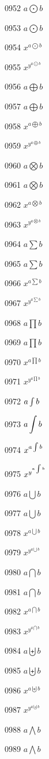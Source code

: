 \documentclass{article}
\begin{document}
0952 $a\bigodot b$\par
0953 $\displaystyle a\bigodot b$\par
0954 $x^{a\bigodot b}$\par
0955 $x^{y^{a\bigodot b}}$\par
0956 $a\bigoplus b$\par
0957 $\displaystyle a\bigoplus b$\par
0958 $x^{a\bigoplus b}$\par
0959 $x^{y^{a\bigoplus b}}$\par
0960 $a\bigotimes b$\par
0961 $\displaystyle a\bigotimes b$\par
0962 $x^{a\bigotimes b}$\par
0963 $x^{y^{a\bigotimes b}}$\par
0964 $a\sum b$\par
0965 $\displaystyle a\sum b$\par
0966 $x^{a\sum b}$\par
0967 $x^{y^{a\sum b}}$\par
0968 $a\prod b$\par
0969 $\displaystyle a\prod b$\par
0970 $x^{a\prod b}$\par
0971 $x^{y^{a\prod b}}$\par
0972 $a\intop b$\par
0973 $\displaystyle a\intop b$\par
0974 $x^{a\intop b}$\par
0975 $x^{y^{a\intop b}}$\par
0976 $a\bigcup b$\par
0977 $\displaystyle a\bigcup b$\par
0978 $x^{a\bigcup b}$\par
0979 $x^{y^{a\bigcup b}}$\par
0980 $a\bigcap b$\par
0981 $\displaystyle a\bigcap b$\par
0982 $x^{a\bigcap b}$\par
0983 $x^{y^{a\bigcap b}}$\par
0984 $a\biguplus b$\par
0985 $\displaystyle a\biguplus b$\par
0986 $x^{a\biguplus b}$\par
0987 $x^{y^{a\biguplus b}}$\par
0988 $a\bigwedge b$\par
0989 $\displaystyle a\bigwedge b$\par
\end{document}
